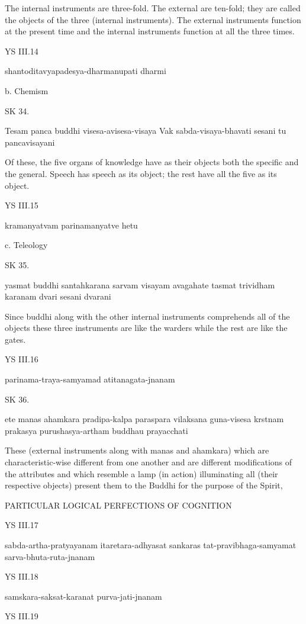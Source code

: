 The internal instruments are three-fold.
The external are ten-fold; they are called the objects of the three (internal instruments).
The external instruments function at the present time and
the internal instruments function at all the three times.

YS III.14

    shantoditavyapadesya-dharmanupati dharmi

    b. Chemism

SK 34.

Tesam panca buddhi visesa-avisesa-visaya
Vak sabda-visaya-bhavati sesani tu pancavisayani

Of these, the five organs of knowledge have as their objects
both the specific and the general.
Speech has speech as its object;
the rest have all the five as its object.

YS III.15

    kramanyatvam parinamanyatve hetu

    c. Teleology

SK 35.

yasmat buddhi santahkarana sarvam visayam avagahate
tasmat trividham karanam dvari sesani dvarani

Since buddhi along with the other internal instruments
comprehends all of the objects these three instruments are
like the warders while the rest are like the gates.

YS III.16

    parinama-traya-samyamad atitanagata-jnanam

SK 36.

ete manas ahamkara pradipa-kalpa paraspara vilaksana
guna-visesa krstnam prakasya purushasya-artham buddhau prayacchati

These (external instruments along with manas and ahamkara)
which are characteristic-wise different from one another
and are different modifications of the attributes
and which resemble a lamp (in action) illuminating all (their respective objects)
present them to the Buddhi for the purpose of the Spirit,

PARTICULAR LOGICAL PERFECTIONS OF COGNITION

YS III.17

    sabda-artha-pratyayanam itaretara-adhyasat sankaras tat-pravibhaga-samyamat sarva-bhuta-ruta-jnanam

YS III.18

    samskara-saksat-karanat purva-jati-jnanam

YS III.19

